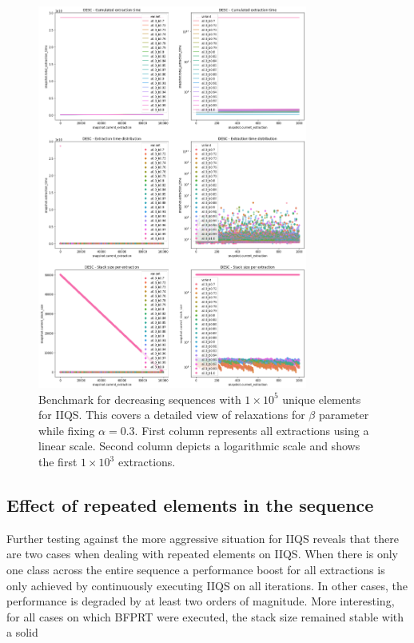 \begin{figure}[p]
    \centering
    \includegraphics[width=0.79\textwidth]{./fragments/04_experimental_execution/images/04_alphabeta_detail_decreasing_right.png}
    \caption{Benchmark for decreasing sequences with $1\times10^5$ unique elements for IIQS. This covers a detailed view of relaxations for $\beta$ parameter while fixing $\alpha=0.3$.  First column represents all extractions using a linear scale. Second column depicts a logarithmic scale and shows the first $1\times10^3$ extractions. }
    \label{FIG:05_ALPHABETA_BENCHMARK_DESC_RIGHT}
\end{figure}

\subsection{Effect of repeated elements in the sequence}

Further testing against the more aggressive situation for IIQS reveals that there are two cases when dealing with repeated elements on IIQS. When there is only one class across the entire sequence a performance boost for all extractions is only achieved by continuously executing IIQS on all iterations. In other cases, the performance is degraded by at least two orders of magnitude. More interesting, for all cases on which BFPRT were executed, the stack size remained stable with a solid %

